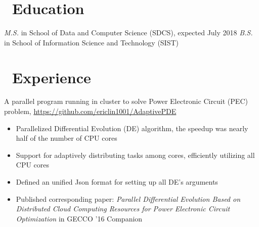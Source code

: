 \documentclass{resume}
\begin{document}


\basicInfo{
	\email{nameljh1001@gmail.com} \textperiodcentered\ 
	\phone{(+86) 135-8053-2764} 
}

\section{\faGraduationCap\ Education}
\textit{M.S.} in School of Data and Computer Science (SDCS), expected July 2018
\textit{B.S.} in School of Information Science and Technology (SIST)

\section{\faUsers\ Experience}
A parallel program running in cluster to solve Power Electronic Circuit (PEC) problem, \url{https://github.com/ericlin1001/AdaptivePDE}
\begin{itemize}
	\item Parallelized Differential Evolution (DE) algorithm, the speedup was nearly half of the number of CPU cores
	\item Support for adaptively distributing tasks among cores, efficiently utilizing all CPU cores
	\item Defined an unified Json format for setting up all DE's arguments
	\item Published corresponding paper: \textit{Parallel Differential Evolution Based on Distributed Cloud Computing Resources for Power Electronic Circuit Optimization} in GECCO '16 Companion 
\end{itemize}

\end{document}
